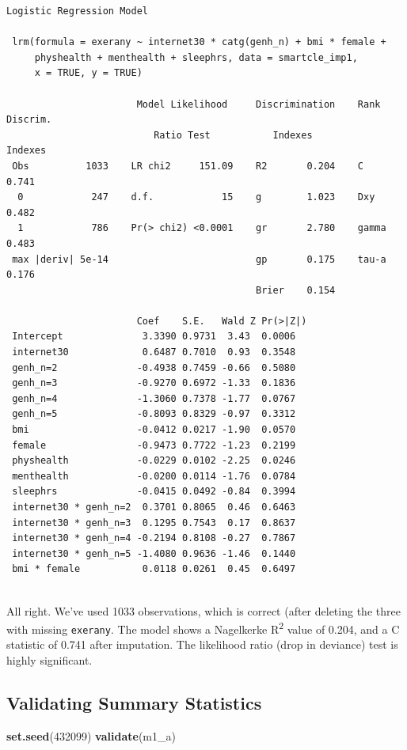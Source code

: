 \documentclass[]{book}
\newenvironment{Shaded}{\begin{snugshade}}{\end{snugshade}}
\newcommand{\KeywordTok}[1]{\textcolor[rgb]{0.13,0.29,0.53}{\textbf{#1}}}
\newcommand{\DecValTok}[1]{\textcolor[rgb]{0.00,0.00,0.81}{#1}}
\newcommand{\NormalTok}[1]{#1}
\theoremstyle{definition}
\theoremstyle{definition}
\theoremstyle{definition}
\theoremstyle{remark}
\begin{document}
\begin{verbatim}
Logistic Regression Model
 
 lrm(formula = exerany ~ internet30 * catg(genh_n) + bmi * female + 
     physhealth + menthealth + sleephrs, data = smartcle_imp1, 
     x = TRUE, y = TRUE)
 
                       Model Likelihood     Discrimination    Rank Discrim.    
                          Ratio Test           Indexes           Indexes       
 Obs          1033    LR chi2     151.09    R2       0.204    C       0.741    
  0            247    d.f.            15    g        1.023    Dxy     0.482    
  1            786    Pr(> chi2) <0.0001    gr       2.780    gamma   0.483    
 max |deriv| 5e-14                          gp       0.175    tau-a   0.176    
                                            Brier    0.154                     
 
                       Coef    S.E.   Wald Z Pr(>|Z|)
 Intercept              3.3390 0.9731  3.43  0.0006  
 internet30             0.6487 0.7010  0.93  0.3548  
 genh_n=2              -0.4938 0.7459 -0.66  0.5080  
 genh_n=3              -0.9270 0.6972 -1.33  0.1836  
 genh_n=4              -1.3060 0.7378 -1.77  0.0767  
 genh_n=5              -0.8093 0.8329 -0.97  0.3312  
 bmi                   -0.0412 0.0217 -1.90  0.0570  
 female                -0.9473 0.7722 -1.23  0.2199  
 physhealth            -0.0229 0.0102 -2.25  0.0246  
 menthealth            -0.0200 0.0114 -1.76  0.0784  
 sleephrs              -0.0415 0.0492 -0.84  0.3994  
 internet30 * genh_n=2  0.3701 0.8065  0.46  0.6463  
 internet30 * genh_n=3  0.1295 0.7543  0.17  0.8637  
 internet30 * genh_n=4 -0.2194 0.8108 -0.27  0.7867  
 internet30 * genh_n=5 -1.4080 0.9636 -1.46  0.1440  
 bmi * female           0.0118 0.0261  0.45  0.6497  
 
\end{verbatim}

All right. We've used 1033 observations, which is correct (after
deleting the three with missing \texttt{exerany}. The model shows a
Nagelkerke R\textsuperscript{2} value of 0.204, and a C statistic of
0.741 after imputation. The likelihood ratio (drop in deviance) test is
highly significant.

\subsection{Validating Summary
Statistics}\label{validating-summary-statistics}

\begin{Shaded}
\begin{Highlighting}[]
\KeywordTok{set.seed}\NormalTok{(}\DecValTok{432099}\NormalTok{)}
\KeywordTok{validate}\NormalTok{(m1_a)}
\end{Highlighting}
\end{Shaded}
\end{document}
